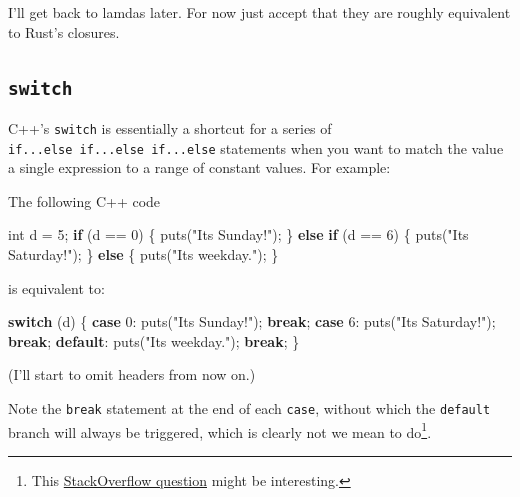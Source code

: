 \documentclass[
]{book}
\newenvironment{Shaded}{\begin{snugshade}}{\end{snugshade}}
\newcommand{\ControlFlowTok}[1]{\textcolor[rgb]{0.13,0.29,0.53}{\textbf{#1}}}
\newcommand{\DataTypeTok}[1]{\textcolor[rgb]{0.13,0.29,0.53}{#1}}
\newcommand{\DecValTok}[1]{\textcolor[rgb]{0.00,0.00,0.81}{#1}}
\newcommand{\NormalTok}[1]{#1}
\newcommand{\StringTok}[1]{\textcolor[rgb]{0.31,0.60,0.02}{#1}}
\begin{document}
I'll get back to lamdas later. For now just accept that they are roughly equivalent to Rust's closures.

\hypertarget{switch}{%
\subsection{\texorpdfstring{\texttt{switch}}{switch}}\label{switch}}

C++'s \texttt{switch} is essentially a shortcut for a series of \texttt{if...else\ if...else\ if...else} statements when you want to match the value a single expression to a range of constant values. For example:

The following C++ code

\begin{Shaded}
\begin{Highlighting}[]
\DataTypeTok{int}\NormalTok{ d = }\DecValTok{5}\NormalTok{;}
\ControlFlowTok{if}\NormalTok{ (d == }\DecValTok{0}\NormalTok{) \{}
\NormalTok{    puts(}\StringTok{"It\textquotesingle{}s Sunday!"}\NormalTok{);}
\NormalTok{\} }\ControlFlowTok{else} \ControlFlowTok{if}\NormalTok{ (d == }\DecValTok{6}\NormalTok{) \{}
\NormalTok{    puts(}\StringTok{"It\textquotesingle{}s Saturday!"}\NormalTok{);}
\NormalTok{\} }\ControlFlowTok{else}\NormalTok{ \{}
\NormalTok{    puts(}\StringTok{"It\textquotesingle{}s weekday."}\NormalTok{);}
\NormalTok{\}}
\end{Highlighting}
\end{Shaded}

is equivalent to:

\begin{Shaded}
\begin{Highlighting}[]
\ControlFlowTok{switch}\NormalTok{ (d)}
\NormalTok{\{}
\ControlFlowTok{case} \DecValTok{0}\NormalTok{:}
\NormalTok{    puts(}\StringTok{"It\textquotesingle{}s Sunday!"}\NormalTok{);}
    \ControlFlowTok{break}\NormalTok{;}
\ControlFlowTok{case} \DecValTok{6}\NormalTok{:}
\NormalTok{    puts(}\StringTok{"It\textquotesingle{}s Saturday!"}\NormalTok{);}
    \ControlFlowTok{break}\NormalTok{;}
\ControlFlowTok{default}\NormalTok{:}
\NormalTok{    puts(}\StringTok{"It\textquotesingle{}s weekday."}\NormalTok{);}
    \ControlFlowTok{break}\NormalTok{;}
\NormalTok{\}}
\end{Highlighting}
\end{Shaded}

(I'll start to omit headers from now on.)

Note the \texttt{break} statement at the end of each \texttt{case}, without which the \texttt{default} branch will always be triggered, which is clearly not we mean to do\footnote{This \href{https://stackoverflow.com/questions/252489/why-was-the-switch-statement-designed-to-need-a-break}{StackOverflow question} might be interesting.}.
\end{document}
